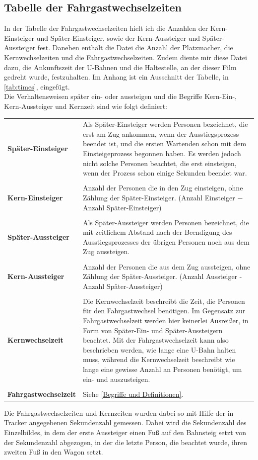 \subsection{Tabelle der Fahrgastwechselzeiten} \label{Zeiten Tabelle}
In der Tabelle der Fahrgastwechselzeiten hielt ich die Anzahlen der Kern-Einsteiger und Später-Einsteiger, sowie der Kern-Aussteiger und Später-Aussteiger fest. Daneben enthält die Datei die Anzahl der Platzmacher, die Kernwechselzeiten und die Fahrgastwechselzeiten.
Zudem diente mir diese Datei dazu, die Ankunftszeit der U-Bahnen und die Haltestelle, an der dieser Film gedreht wurde, festzuhalten. Im Anhang ist ein Ausschnitt der Tabelle, in \tablename \ref{tab:times}, eingefügt. \\
Die Verhaltensweisen später ein- oder aussteigen und die Begriffe Kern-Ein-, Kern-Aussteiger und Kernzeit sind wie folgt definiert:
\begin{longtable}{p{2.5 cm} p{11.5 cm}}
		\textbf{Spä\-ter-Ein\-stei\-ger} & Als Später-Einsteiger werden Personen bezeichnet, die erst am Zug ankommen, wenn der Ausstiegsprozess beendet ist, und die ersten Wartenden schon mit dem Einsteigeprozess begonnen haben. Es werden jedoch nicht solche Personen beachtet, die erst einsteigen, wenn der Prozess schon einige Sekunden beendet war.\\
		 & \\
		\textbf{Kern-Ein\-stei\-ger} & Anzahl der Personen die in den Zug einsteigen, ohne Zählung der Später-Einsteiger. (Anzahl Einsteiger $-$ Anzahl Später-Ein\-stei\-ger) \\
		 & \\
		 \textbf{Spä\-ter-Aus\-stei\-ger} & Als Später-Aussteiger werden Personen bezeichnet, die mit zeitlichem Abstand nach der Beendigung des Ausstiegsprozesses der übrigen Personen noch aus dem Zug aussteigen.\\
		 & \\
		\textbf{Kern-Aus\-stei\-ger} & Anzahl der Personen die aus dem Zug aussteigen, ohne Zählung der Später-Aussteiger. (Anzahl Aussteiger - Anzahl Später-Aus\-stei\-ger)\\
		 & \\
		 \textbf{Kern\-wech\-sel\-zeit} & Die Kernwechselzeit beschreibt die Zeit, die Personen für den Fahrgastwechsel benötigen. Im Gegensatz zur Fahrgastwechselzeit werden hier keinerlei Ausreißer, in Form von Später-Ein- und Später-Aussteigern beachtet. Mit der Fahrgastwechselzeit kann also beschrieben werden, wie lange eine U-Bahn halten muss, während die Kernwechselzeit beschreibt wie lange eine gewisse Anzahl an Personen benötigt, um ein- und auszusteigen. \\
		 & \\
		 \textbf{Fahr\-gast\-wech\-sel\-zeit} & Siehe \ref{Begriffe und Definitionen}.
\end{longtable}
Die Fahrgastwechselzeiten und Kernzeiten wurden dabei so mit Hilfe der in \textsf{Tracker} angegebenen Sekundenzahl gemessen. Dabei wird die Sekundenzahl des Einzelbildes, in dem der erste Aussteiger einen Fuß auf den Bahnsteig setzt von der Sekundenzahl abgezogen, in der die letzte Person, die beachtet wurde, ihren zweiten Fuß in den Wagon setzt.

